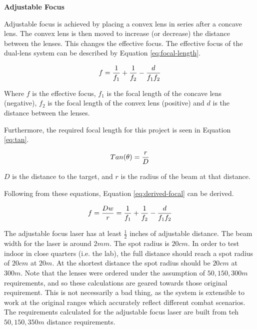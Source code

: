 \documentclass[letterpaper,10pt]{article}
\begin{document}
\begin{spacing}{1.15}
\hspace{5mm} \textbf{Adjustable Focus}

Adjustable focus is achieved by placing a convex lens in series after a concave lens. The convex lens is then moved to increase (or decrease) the distance between the lenses. This changes the effective focus. The effective focus of the dual-lens system can be described by Equation \ref{eq:focal-length}.

\begin{equation} \label{eq:focal-length}
	\large
	f = \frac{1}{f_1} + \frac{1}{f_2} - \frac{d}{f_1 f_2}
\end{equation}

Where $f$ is the effective focus, $f_1$ is the focal length of the concave lens (negative), $f_2$ is the focal length of the convex lens (positive) and $d$ is the distance between the lenses. 

Furthermore, the required focal length for this project is seen in Equation \ref{eq:tan}.

\begin{equation} \large \label{eq:tan}
	Tan(\theta) = \frac{r}{D}
\end{equation}

$D$ is the distance to the target, and $r$ is the radius of the beam at that distance. 

Following from these equations, Equation \ref{eq:derived-focal} can be derived.

\begin{equation} \large \label{eq:derived-focal}
	f = \frac{Dw}{r} =  \frac{1}{f_1} + \frac{1}{f_2} - \frac{d}{f_1 f_2}
\end{equation}



The adjustable focus laser has at least $\frac{1}{2}$ inches of adjustable distance. The beam width for the laser is around $2mm$. The spot radius is $20cm$. In order to test indoor in close quarters (i.e. the lab), the full distance should reach a spot radius of $20cm$ at $20 m$. At the shortest distance the spot radius should be $20cm$ at $300m$. Note that the lenses were ordered under the assumption of $50, 150, 300 m$ requirements, and so these calculations are geared towards those original requirement. This is not necessarily a bad thing, as the system is extensible to work at the original ranges which accurately reflect different combat scenarios. The requirements calculated for the adjustable focus laser are built from teh $50, 150, 350 m$ distance requirements.


\end{spacing}
\end{document}
